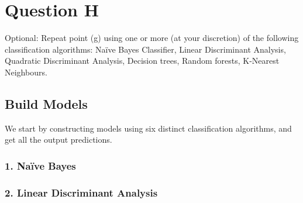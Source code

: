 \documentclass[
]{article}
\newenvironment{Shaded}{\begin{snugshade}}{\end{snugshade}}
\newcommand{\AttributeTok}[1]{\textcolor[rgb]{0.13,0.29,0.53}{#1}}
\newcommand{\CommentTok}[1]{\textcolor[rgb]{0.56,0.35,0.01}{\textit{#1}}}
\newcommand{\DecValTok}[1]{\textcolor[rgb]{0.00,0.00,0.81}{#1}}
\newcommand{\FloatTok}[1]{\textcolor[rgb]{0.00,0.00,0.81}{#1}}
\newcommand{\FunctionTok}[1]{\textcolor[rgb]{0.13,0.29,0.53}{\textbf{#1}}}
\newcommand{\NormalTok}[1]{#1}
\newcommand{\OtherTok}[1]{\textcolor[rgb]{0.56,0.35,0.01}{#1}}
\newcommand{\SpecialCharTok}[1]{\textcolor[rgb]{0.81,0.36,0.00}{\textbf{#1}}}
\newcommand{\StringTok}[1]{\textcolor[rgb]{0.31,0.60,0.02}{#1}}
\begin{document}
\hypertarget{question-h}{%
\section{Question H}\label{question-h}}

Optional: Repeat point (g) using one or more (at your discretion) of the
following classification algorithms: Naïve Bayes Classifier, Linear
Discriminant Analysis, Quadratic Discriminant Analysis, Decision trees,
Random forests, K-Nearest Neighbours.

\hypertarget{build-models}{%
\subsection{Build Models}\label{build-models}}

We start by constructing models using six distinct classification
algorithms, and get all the output predictions.

\hypertarget{nauxefve-bayes}{%
\subsubsection{1. Naïve Bayes}\label{nauxefve-bayes}}

\begin{Shaded}
\end{Shaded}

\hypertarget{linear-discriminant-analysis}{%
\subsubsection{2. Linear Discriminant
Analysis}\label{linear-discriminant-analysis}}
\end{document}
